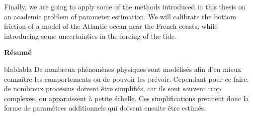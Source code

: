 Finally, we are going to apply some of the methods introduced in this
thesis on an academic problem of parameter estimation. We will
calibrate the bottom friction of a model of the Atlantic ocean near
the French coasts, while introducing some uncertainties in the forcing
of the tide.



%
%
%

\vspace{0.5cm}
\etoile
\vspace{0.5cm}
\begin{center}
  \bf Résumé
\end{center}
\vspace{0.3cm}
blablabla
De nombreux phénomènes physiques sont modélisés afin
d'en mieux connaître les comportements ou de pouvoir les
prévoir. Cependant pour ce faire, de nombreux processus doivent être
simplifiés, car ils sont souvent trop complexes, ou apparaissent à
petite échelle. Ces simplifications prennent donc la forme de
paramètres additionnels qui doivent ensuite être estimés.

